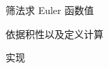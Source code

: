 \begin{frame}{筛法求 Euler 函数值}
	\label{mulf:algo:euler-seive}

	依据积性以及定义计算
\end{frame}


\begin{frame}{实现}
\end{frame}

